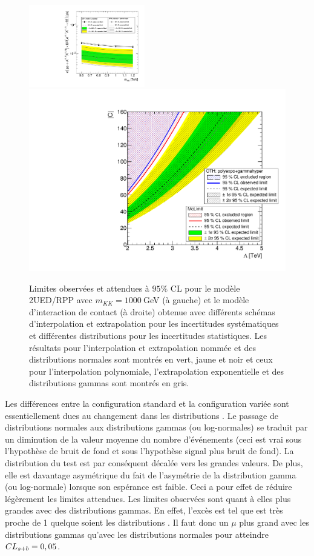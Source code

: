 \vspace*{-0.5cm}
\begin{center}
\begin{figure}[!htb]
\includegraphics[width=0.45\textwidth]{macros/ExclusionPlot_RPPFullStat_McLimitVsOTHpolyexpo_gammahyper.pdf}
\includegraphics[width=.48\textwidth]{macros/CVsLambdaForContactInteractionMcLimitVsOTHpolyexpogammahyper.pdf}
\caption{Limites observ\'ees et attendues \`a $95\%$ CL pour le mod\`ele 2UED/RPP avec $m_{KK}=1000~$GeV (\`a gauche) et le mod\`ele d'interaction de contact (\`a droite) obtenue avec diff\'erents sch\'emas d'interpolation et extrapolation pour les incertitudes syst\'ematiques et diff\'erentes distributions \prior{} pour les incertitudes statistiques. Les r\'esultats pour l'interpolation et extrapolation nomm\'ee \mclimit{} et des distributions \prior{} normales sont montr\'es en vert, jaune et noir et ceux pour l'interpolation polynomiale, l'extrapolation exponentielle et des distributions \prior{} gammas sont montr\'es en gris. \label{fig:interpretationHybrideVariee}}
\end{figure}
\end{center}
\vspace*{-1cm}
Les diff\'erences entre la configuration standard et la configuration vari\'ee sont essentiellement dues au changement dans les distributions \prior{}. Le passage de distributions normales aux distributions gammas (ou log-normales) se traduit par un diminution de la valeur moyenne du nombre d'\'ev\'enements (ceci est vrai sous l'hypoth\`ese de bruit de fond et sous l'hypoth\`ese signal plus bruit de fond). 
La distribution du test est par cons\'equent d\'ecal\'ee vers les grandes valeurs.
De plus, elle est davantage asym\'etrique du fait de l'asym\'etrie de la distribution gamma (ou log-normale) lorsque son esp\'erance est faible. 
Ceci a pour effet de r\'eduire l\'eg\`erement les limites attendues. 
Les limites observ\'ees sont quant \`a elles plus grandes avec des distributions gammas. En effet, l'exc\`es est tel que \CLb{} est tr\`es proche de 1 quelque soient les distributions \prior. Il faut donc un $\mu$ plus grand avec les distributions gammas qu'avec les distributions normales pour atteindre $CL_{s+b}=0,05$. 

